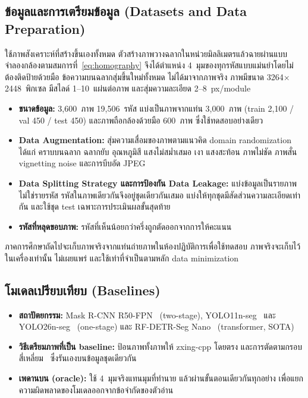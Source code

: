 \documentclass[20pt,a4paper]{article}
\begin{document}
\subsection{ข้อมูลและการเตรียมข้อมูล
(Datasets and Data Preparation)}

ใช้ภาพสังเคราะห์ที่สร้างขึ้นเองทั้งหมด
ตัวสร้างภาพวางฉลากในหน่วยมิลลิเมตรแล้วฉายผ่านแบบจำลองกล้องตามสมการที่~\ref{eq:homography}
จึงได้ตำแหน่ง 4~มุมของทุกรหัสแบบแม่นยำโดยไม่ต้องติดป้ายด้วยมือ
ข้อความบนฉลากสุ่มขึ้นใหม่ทั้งหมด ไม่ได้มาจากภาพจริง
ภาพมีขนาด 3264$\times$2448~พิกเซล
มีสไลด์ 1--10~แผ่นต่อภาพ และสุ่มความละเอียด 2--8~px/module

\begin{itemize}
    \item \textbf{ขนาดข้อมูล:} 3,600~ภาพ 19,506~รหัส
    แบ่งเป็นภาพจากแท่น 3,000~ภาพ (train 2,100 / val 450 / test 450)
    และภาพถือกล้องด้วยมือ 600~ภาพ ซึ่งใช้ทดสอบอย่างเดียว

    \item \textbf{Data Augmentation:} สุ่มความเสื่อมของภาพตามแนวคิด domain randomization~\cite{tremblay2018domain}
    ได้แก่ คราบบนฉลาก ฉลากยับ อุณหภูมิสี แสงไม่สม่ำเสมอ เงา แสงสะท้อน
    ภาพไม่ชัด ภาพสั่น vignetting noise และการบีบอัด JPEG

    \item \textbf{Data Splitting Strategy และการป้องกัน Data Leakage:}
    แบ่งข้อมูลเป็นรายภาพ ไม่ใช่รายรหัส รหัสในภาพเดียวกันจึงอยู่ชุดเดียวกันเสมอ
    แบ่งให้ทุกชุดมีสัดส่วนความละเอียดเท่ากัน
    และใช้ชุด test เฉพาะการประเมินผลขั้นสุดท้าย

    \item \textbf{รหัสที่หลุดขอบภาพ:} รหัสที่เห็นน้อยกว่าครึ่งถูกตัดออกจากการให้คะแนน
\end{itemize}

ภาคการศึกษาถัดไปจะเก็บภาพจริงจากแท่นถ่ายภาพในห้องปฏิบัติการเพื่อใช้ทดสอบ
ภาพจริงจะเก็บไว้ในเครื่องเท่านั้น ไม่เผยแพร่ และใช้เท่าที่จำเป็นตามหลัก data minimization

\subsection{โมเดลเปรียบเทียบ
(Baselines)}

\begin{itemize}
    \item \textbf{สถาปัตยกรรม:} Mask R-CNN R50-FPN~\cite{he2017maskrcnn} (two-stage),
    YOLO11n-seg~\cite{khanam2024yolov11} และ YOLO26n-seg~\cite{sapkota2025yolo26} (one-stage)
    และ RF-DETR-Seg Nano~\cite{robinson2026rfdetr} (transformer, SOTA)

    \item \textbf{วิธีเตรียมภาพที่เป็น baseline:} ป้อนภาพทั้งภาพให้ zxing-cpp โดยตรง
    และการตัดตามกรอบสี่เหลี่ยม~\cite{alsulami2026uav} ซึ่งรันเองบนข้อมูลชุดเดียวกัน

    \item \textbf{เพดานบน (oracle):} ใช้ 4~มุมจริงแทนมุมที่ทำนาย
    แล้วผ่านขั้นตอนเดียวกันทุกอย่าง เพื่อแยกความผิดพลาดของโมเดลออกจากข้อจำกัดของตัวอ่าน
\end{itemize}
\end{document}
